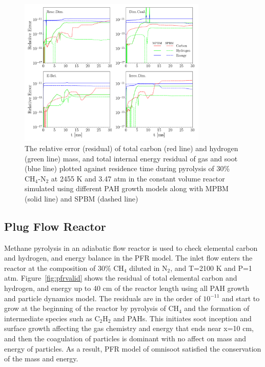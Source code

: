 \begin{figure}[H]
	\centering
	\includegraphics[width=0.8\textwidth]{Figures/Results/Validation/ConstUV/relerr_constuv.pdf}
	\caption{The relative error (residual) of total carbon (red line) and hydrogen (green line) mass, and total internal energy residual of gas and soot (blue line) plotted against residence time during pyrolysis of 30\% $\mathrm{CH_4}$-$\mathrm{N_2}$ at 2455 K and 3.47 atm in the constant volume reactor simulated using different PAH growth models along with MPBM (solid line) and SPBM (dashed line)}
	\label{fig:constuvvalid}
\end{figure}

\subsection{Plug Flow Reactor}
Methane pyrolysis in an adiabatic flow reactor is used to check elemental carbon and hydrogen, and energy balance in the PFR model. The inlet flow enters the reactor at the composition of 30\% $\mathrm{CH_4}$ diluted in $\mathrm{N_2}$, and T=2100 K and P=1 atm. Figure~\ref{fig:pfrvalid} shows the residual of total elemental carbon and hydrogen, and energy up to 40 cm of the reactor length using all PAH growth and particle dynamics model. The residuals are in the order of $10^{-11}$ and start to grow at the beginning of the reactor by pyrolysis of $\mathrm{CH_4}$ and the formation of intermediate species such as $\mathrm{C_2H_2}$ and PAHs. This initiates soot inception and surface growth affecting the gas chemistry and energy that ends near x=10 cm, and then the coagulation of particles is dominant with no affect on mass and energy of particles. As a result, PFR model of omnisoot satisfied the conservation of the mass and energy.




